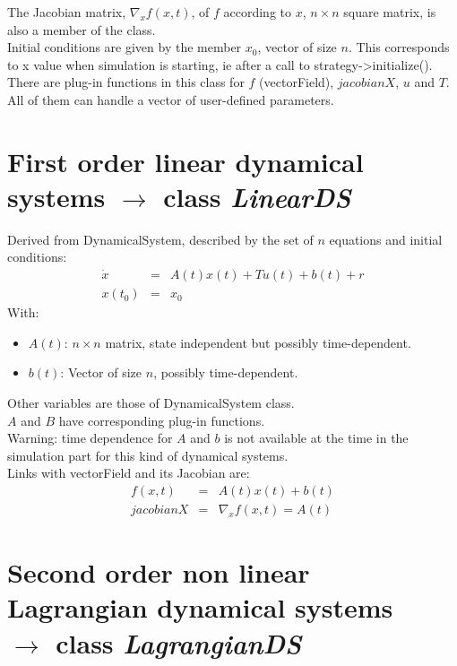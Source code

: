\documentclass[10pt]{report}
\begin{document}
The Jacobian matrix, $\nabla_x f(x,t)$, of $f$ according to $x$, $n\times n$ square matrix, is also a member of the class. \\

Initial conditions are given by the member $x_0$, vector of size $n$. This corresponds to x value when
simulation is starting, ie after a call to strategy->initialize(). \\

There are plug-in functions in this class for $f$ (vectorField), $jacobianX$, $u$ and $T$. All
of them can handle a vector of user-defined parameters.

\section{First order linear dynamical systems $\rightarrow$ class \it{LinearDS}}

Derived from DynamicalSystem, described by the set of $n$ equations and initial conditions:
\begin{eqnarray}
  \dot x &=& A(t)x(t)+Tu(t)+b(t)+r \\
  x(t_0)&=&x_0
\end{eqnarray}
With:
\begin{itemize}
\item $A(t)$: $n\times n$ matrix, state independent but possibly time-dependent.
\item $b(t)$: Vector of size $n$, possibly time-dependent.
\end{itemize}
Other variables are those of DynamicalSystem class. \\
$A$ and $B$ have corresponding plug-in functions. \\

Warning: time dependence for $A$ and $b$ is not available at the time in the simulation part for this kind of dynamical systems. \\

Links with vectorField and its Jacobian are:
\begin{eqnarray}
  f(x,t) &=& A(t)x(t)+b(t) \\
  jacobianX&=&\nabla_x f(x,t) = A(t)
\end{eqnarray}

\section{Second order non linear Lagrangian dynamical systems \\  $\rightarrow$ class \it{LagrangianDS}}
\end{document}
